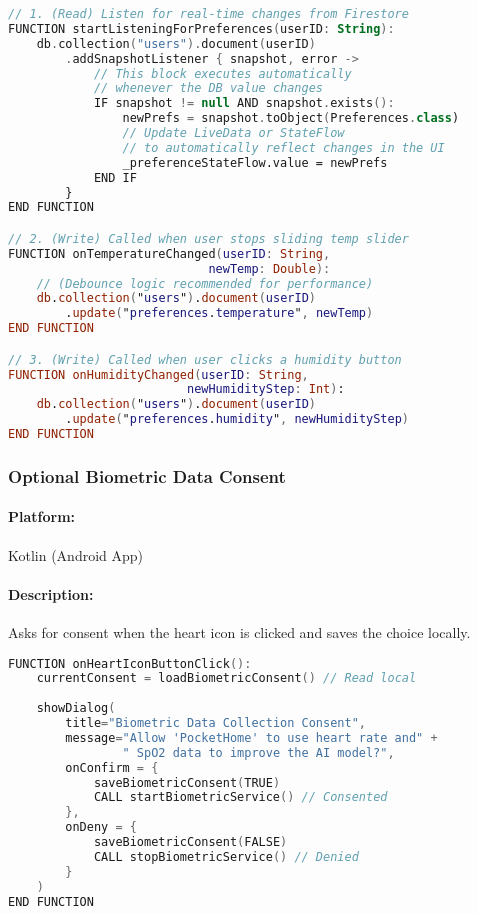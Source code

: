 \documentclass[conference]{IEEEtran}
\begin{document}
\begin{lstlisting}[language=Kotlin]
// 1. (Read) Listen for real-time changes from Firestore
FUNCTION startListeningForPreferences(userID: String):
    db.collection("users").document(userID)
        .addSnapshotListener { snapshot, error ->
            // This block executes automatically
            // whenever the DB value changes
            IF snapshot != null AND snapshot.exists():
                newPrefs = snapshot.toObject(Preferences.class)
                // Update LiveData or StateFlow 
                // to automatically reflect changes in the UI
                _preferenceStateFlow.value = newPrefs
            END IF
        }
END FUNCTION

// 2. (Write) Called when user stops sliding temp slider
FUNCTION onTemperatureChanged(userID: String, 
                            newTemp: Double):
    // (Debounce logic recommended for performance)
    db.collection("users").document(userID)
        .update("preferences.temperature", newTemp)
END FUNCTION

// 3. (Write) Called when user clicks a humidity button
FUNCTION onHumidityChanged(userID: String, 
                         newHumidityStep: Int):
    db.collection("users").document(userID)
        .update("preferences.humidity", newHumidityStep)
END FUNCTION
\end{lstlisting}


\subsubsection{Optional Biometric Data Consent}
\paragraph{Platform:} Kotlin (Android App)
\paragraph{Description:} Asks for consent when the heart icon is clicked and saves the choice locally.

\begin{lstlisting}[language=Kotlin]
FUNCTION onHeartIconButtonClick():
    currentConsent = loadBiometricConsent() // Read local
    
    showDialog(
        title="Biometric Data Collection Consent",
        message="Allow 'PocketHome' to use heart rate and" +
                " SpO2 data to improve the AI model?",
        onConfirm = {
            saveBiometricConsent(TRUE)
            CALL startBiometricService() // Consented
        },
        onDeny = {
            saveBiometricConsent(FALSE)
            CALL stopBiometricService() // Denied
        }
    )
END FUNCTION
\end{lstlisting}
\end{document}
